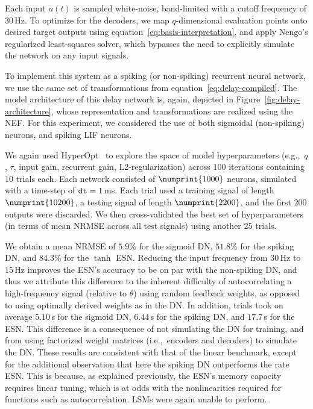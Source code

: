 Each input $u(t)$ is sampled white-noise, band-limited with a cutoff frequency of $30$\,Hz.
To optimize for the decoders, we map $q$-dimensional evaluation points onto desired target outputs using equation~\ref{eq:basis-interpretation}, and apply Nengo's regularized least-squares solver, which bypasses the need to explicitly simulate the network on any input signals.

To implement this system as a spiking (or non-spiking) recurrent neural network, we use the same set of transformations from equation~\ref{eq:delay-compiled}. %
The model architecture of this delay network is, again, depicted in Figure~\ref{fig:delay-architecture}, whose representation and transformations are realized using the NEF.
For this experiment, we considered the use of both sigmoidal (non-spiking) neurons, and spiking LIF neurons.

We again used HyperOpt~\citep{bergstra2015hyperopt} to explore the space of model hyperparameters (e.g.,~$q$, $\tau$, input gain, recurrent gain, L2-regularization) across $100$ iterations containing $10$ trials each.
Each network consisted of $\numprint{1000}$ neurons, simulated with a time-step of $\texttt{dt}{} = 1$\,ms.
Each trial used a training signal of length $\numprint{10200}$, a testing signal of length $\numprint{2200}$, and the first $200$ outputs were discarded.
We then cross-validated the best set of hyperparameters (in terms of mean NRMSE across all test signals) using another $25$ trials.

We obtain a mean NRMSE of $5.9$\% for the sigmoid DN, $51.8$\% for the spiking DN, and $84.3$\% for the $\tanh$ ESN.
Reducing the input frequency from $30$\,Hz to $15$\,Hz improves the ESN's accuracy to be on par with the non-spiking DN, and thus we attribute this difference to the inherent difficulty of autocorrelating a high-frequency signal (relative to $\theta$) using random feedback weights, as opposed to using optimally derived weights as in the DN.
In addition, trials took on average $5.10$\,s for the sigmoid DN, $6.44$\,s for the spiking DN, and $17.7$\,s for the ESN.
This difference is a consequence of not simulating the DN for training, and from using factorized weight matrices (i.e.,~encoders and decoders) to simulate the DN.
These results are consistent with that of the linear benchmark, except for the additional observation that here the spiking DN outperforms the rate ESN.
This is because, as explained previously, the ESN's memory capacity requires linear tuning, which is at odds with the nonlinearities required for functions such as autocorrelation.
LSMs were again unable to perform.


